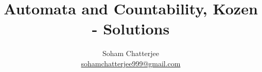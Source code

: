 \documentclass{report}
\title{\Huge{Automata and Countability, Kozen - Solutions}}
\author{\huge{Soham Chatterjee\\ \url{sohamchatterjee999@gmail.com}  }}
\date{}
\begin{document}
	
\maketitle
	
\pagebreak


	
\end{document}
